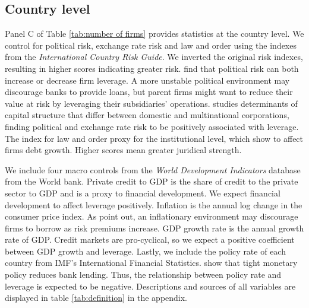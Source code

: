 \documentclass[12pt]{article}
\begin{document}
	\subsection{Country level} \label{subsec:country}
	Panel C of Table \ref{tab:number of firms} provides statistics at the country level. We control for political risk, exchange rate risk and law and order using the indexes from the \textit{International Country Risk Guide}. We inverted the original risk indexes, resulting in higher scores indicating greater risk. \cite*{kesternich2010afraid} find that political risk can both increase or decrease firm leverage. A more unstable political environment may discourage banks to provide loans, but parent firms might want to reduce their value at risk by leveraging their subsidiaries' operations. \cite*{burgman1996empirical} studies determinants of capital structure that differ between domestic and multinational corporations, finding political and exchange rate risk to be positively associated with leverage. The index for law and order proxy for the institutional level, which \cite*{demirgucc1998law} show to affect firms debt growth. Higher scores mean greater juridical strength.
	
	 We include four macro controls from the \textit{World Development Indicators} database from the World bank. Private credit to GDP is the share of credit to the private sector to GDP and is a proxy to financial development. We expect financial development to affect leverage positively. Inflation is the annual log change in the consumer price index. As \cite{huizinga2008capital} point out, an inflationary environment may discourage firms to borrow as risk premiums increase. GDP growth rate is the annual growth rate of GDP. Credit markets are pro-cyclical, so we expect a positive coefficient between GDP growth and leverage. Lastly, we include the policy rate of each country from IMF's International Financial Statistics. \cite*{jimenez2012credit} show that tight monetary policy reduces bank lending. Thus, the relationship between policy rate and leverage is expected to be negative. Descriptions and sources of all variables are displayed in table \ref{tab:definition} in the appendix.
			
\end{document}
